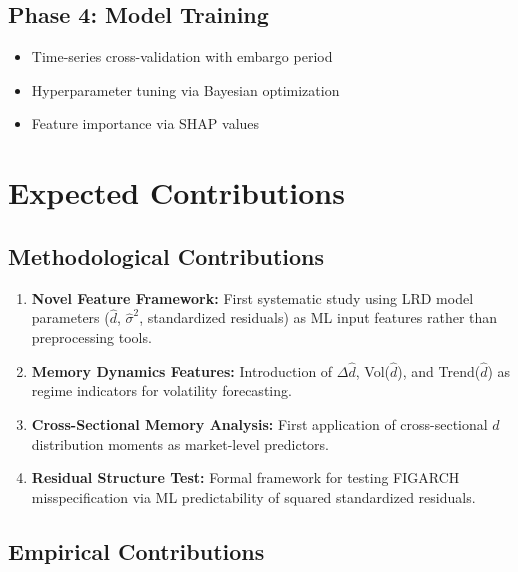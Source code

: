 \documentclass[11pt,a4paper]{article}
\theoremstyle{definition}
\newcommand{\dhat}{\hat{d}}
\newcommand{\sigmahat}{\hat{\sigma}}
\begin{document}
\subsection{Phase 4: Model Training}

\begin{itemize}
    \item Time-series cross-validation with embargo period
    \item Hyperparameter tuning via Bayesian optimization
    \item Feature importance via SHAP values
\end{itemize}

\section{Expected Contributions}

\subsection{Methodological Contributions}

\begin{enumerate}
    \item \textbf{Novel Feature Framework:} First systematic study using LRD model parameters ($\dhat$, $\sigmahat^2$, standardized residuals) as ML input features rather than preprocessing tools.
    
    \item \textbf{Memory Dynamics Features:} Introduction of $\Delta\dhat$, Vol($\dhat$), and Trend($\dhat$) as regime indicators for volatility forecasting.
    
    \item \textbf{Cross-Sectional Memory Analysis:} First application of cross-sectional $\dhat$ distribution moments as market-level predictors.
    
    \item \textbf{Residual Structure Test:} Formal framework for testing FIGARCH misspecification via ML predictability of squared standardized residuals.
\end{enumerate}

\subsection{Empirical Contributions}
\end{document}
